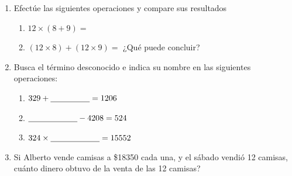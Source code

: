 \documentclass[fleqn]{article}
\begin{document}
\begin{enumerate}
  \item Efectúe las siguientes operaciones y compare sus resultados
  \begin{enumerate}
  \item $12\times (8+9)=$\noanswer
  \item $(12 \times 8)+(12\times 9)=$ \noanswer
  ¿Qué puede concluir?\noanswer
  \end{enumerate}
   \item Busca el término desconocido e indica su nombre en las siguientes operaciones:
   \begin{enumerate}
   \item $329+\underline{\hspace*{48pt}}=1206$\noanswer
   \item $\underline{\hspace*{60pt}}-4208=524$\noanswer
   \item $324\times \underline{\hspace*{60pt}}=15552 $\noanswer
   \end{enumerate}
   \item Si Alberto vende camisas a \$18350 cada una, y el sábado vendió 12 camisas, cuánto dinero obtuvo de la venta de las 12 camisas?\noanswer
\end{enumerate}
\end{document}
